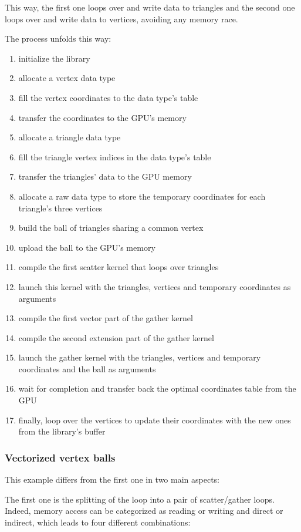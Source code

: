 \documentclass[a4paper,12pt]{article}
\begin{document}
This way, the first one loops over and write data to triangles and the second one loops over and write data to vertices, avoiding any memory race.

The process unfolds this way:
\begin{enumerate}
\item initialize the library
\item allocate a vertex data type
\item fill the vertex coordinates to the data type's table
\item transfer the coordinates to the GPU's memory
\item allocate a triangle data type
\item fill the triangle vertex indices in the data type's table
\item transfer the triangles' data to the GPU memory
\item allocate a raw data type to store the temporary coordinates for each triangle's three vertices
\item build the ball of triangles sharing a common vertex
\item upload the ball to the GPU's memory
\item compile the first scatter kernel that loops over triangles
\item launch this kernel with the triangles, vertices and temporary coordinates as arguments
\item compile the first vector part of the gather kernel
\item compile the second extension part of the gather kernel
\item launch the gather kernel with the triangles, vertices and temporary coordinates and the ball as arguments
\item wait for completion and transfer back the optimal coordinates table from the GPU
\item finally, loop over the vertices to update their coordinates with the new ones from the library's buffer
\end{enumerate}

\subsubsection{Vectorized vertex balls}
This example differs from the first one in two main aspects:

The first one is the splitting of the loop into a pair of scatter/gather loops.
Indeed, memory access can be categorized as reading or writing and direct or indirect, which leads to four different combinations:
\end{document}
